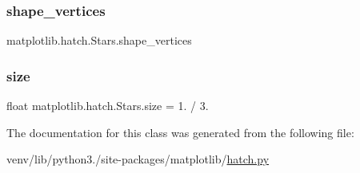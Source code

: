 \subsubsection{\texorpdfstring{shape\+\_\+vertices}{shape\_vertices}}
{\footnotesize\ttfamily matplotlib.\+hatch.\+Stars.\+shape\+\_\+vertices}

\mbox{\label{classmatplotlib_1_1hatch_1_1Stars_ae34643985ae443f7b26b7c1b23f211b3}} 
\subsubsection{\texorpdfstring{size}{size}}
{\footnotesize\ttfamily float matplotlib.\+hatch.\+Stars.\+size = 1. / 3.\hspace{0.3cm}{\ttfamily [static]}}



The documentation for this class was generated from the following file\+:\begin{DoxyCompactItemize}
\item 
venv/lib/python3./site-\/packages/matplotlib/\hyperlink{hatch_8py}{hatch.\+py}\end{DoxyCompactItemize}
